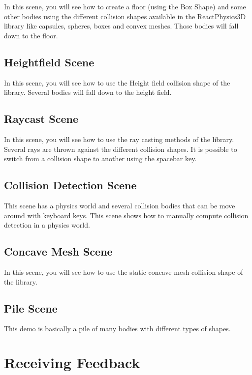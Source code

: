\documentclass[a4paper,12pt]{article}
\begin{document}
    In this scene, you will see how to create a floor (using the Box Shape) and some other bodies using the different collision shapes available
    in the ReactPhysics3D library like capsules, spheres, boxes and convex meshes. Those bodies will fall down to the floor.

    \subsection{Heightfield Scene}

    In this scene, you will see how to use the Height field collision shape of the library. Several bodies will fall
    down to the height field.

   \subsection{Raycast Scene}

    In this scene, you will see how to use the ray casting methods of the library. Several rays are thrown against the different collision shapes.
    It is possible to switch from a collision shape to another using the spacebar key.

   \subsection{Collision Detection Scene}

    This scene has a physics world and several collision bodies that can be move around with keyboard keys. This scene shows how to manually compute
    collision detection in a physics world.

    \subsection{Concave Mesh Scene}

    In this scene, you will see how to use the static concave mesh collision shape of the library.

    \subsection{Pile Scene}

    This demo is basically a pile of many bodies with different types of shapes.

    \section{Receiving Feedback}
    \label{sec:receiving_feedback}
\end{document}
